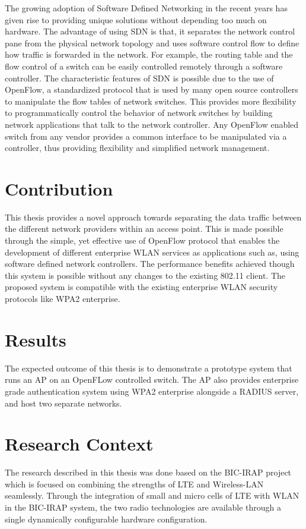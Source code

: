 The growing adoption of Software Defined Networking in the recent years has given rise to providing unique solutions without depending too much on hardware. The advantage of using SDN is that, it separates the network control pane from the physical network topology and uses software control flow to define how traffic is forwarded in the network. For example, the routing table and the flow control of a switch can be easily controlled remotely through a software controller. The characteristic features of SDN is possible due to the use of OpenFlow, a standardized protocol that is used by many open source controllers to manipulate the flow tables of network switches. This provides more flexibility to programmatically control the behavior of network switches by building network applications that talk to the network controller. Any OpenFlow enabled switch from any vendor provides a common interface to be manipulated via a controller, thus providing flexibility and simplified network management.

\section{Contribution}\label{sec:contribution}

This thesis provides a novel approach towards separating the data traffic between the different network providers within an access point. This is made possible through the simple, yet effective use of OpenFlow protocol that enables the development of different enterprise WLAN services as applications such as, using software defined network controllers. The performance benefits achieved though this system is possible without any changes to the existing 802.11 client. The proposed system is compatible with the existing enterprise WLAN security protocols like WPA2 enterprise.

\section{Results}\label{sec:Results}
The expected outcome of this thesis is to demonstrate a prototype system that runs an AP on an OpenFLow controlled switch. The AP also provides enterprise grade authentication system using WPA2 enterprise alongside a RADIUS server, and host two separate networks. 

\section{Research Context\cite{BIC:IRAP}}\label{sec:BIC-IRAP}
The research described in this thesis was done based on the BIC-IRAP project which is focused on combining the strengths of LTE and Wireless-LAN seamlessly. Through the integration of small and micro cells of LTE with WLAN in the BIC-IRAP system, the two radio technologies are available through a single dynamically configurable hardware configuration.

